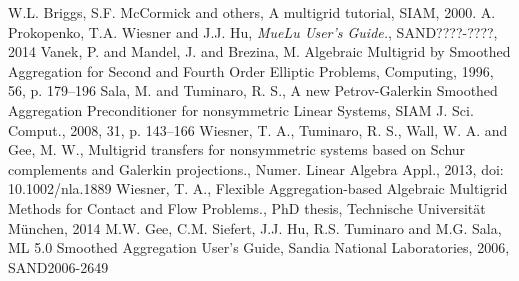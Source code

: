 \documentclass[10pt,fleqn]{book}
\begin{document}
\begin{thebibliography}{99}
 W.L. Briggs, S.F. McCormick and others, A multigrid tutorial, SIAM, 2000.
 A. Prokopenko, T.A. Wiesner and J.J. Hu, \emph{MueLu User's Guide.}, SAND????-????, 2014
 Vanek, P. and Mandel, J. and Brezina, M. Algebraic Multigrid by Smoothed Aggregation for Second and Fourth Order Elliptic Problems, Computing, 1996, 56, p. 179--196
 Sala, M. and Tuminaro, R. S., A new Petrov-Galerkin Smoothed Aggregation Preconditioner for nonsymmetric Linear Systems, SIAM J. Sci. Comput., 2008, 31, p. 143--166
 Wiesner, T. A., Tuminaro, R. S., Wall, W. A. and Gee, M. W., Multigrid transfers for nonsymmetric systems based on Schur complements and Galerkin projections., Numer. Linear Algebra Appl., 2013, doi: 10.1002/nla.1889
 Wiesner, T. A., Flexible Aggregation-based Algebraic Multigrid Methods for Contact and Flow Problems., PhD thesis, Technische Universit\"at M\"unchen, 2014
 M.W. Gee, C.M. Siefert, J.J. Hu, R.S. Tuminaro and M.G. Sala, ML 5.0 Smoothed Aggregation User's Guide, Sandia National Laboratories, 2006, SAND2006-2649
\end{thebibliography}
\end{document}

